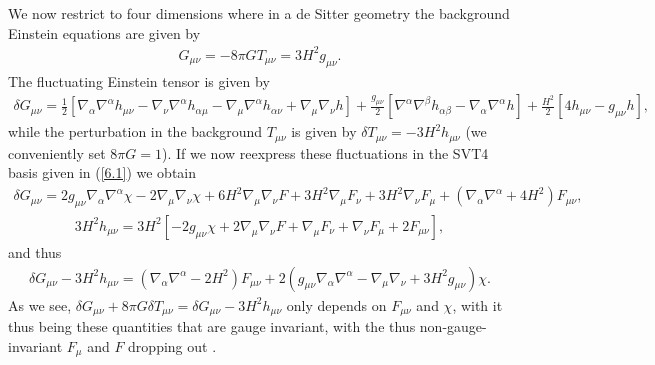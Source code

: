 \documentclass[aps,onecolumn,10pt]{revtex4}
\numberwithin{equation}{section}
\numberwithin{equation}{section}
\begin{document}
We now restrict to  four dimensions where in a de Sitter geometry  the background Einstein equations are given by 
%
\begin{eqnarray}
G_{\mu\nu}=-8\pi G T_{\mu\nu}=3H^2g_{\mu\nu}.
\label{6.15}
\end{eqnarray}
% 
The fluctuating Einstein tensor is given by 
%
\begin{eqnarray}
\delta G_{\mu\nu}=\frac{1}{2}\left[\nabla_{\alpha}\nabla^{\alpha}h_{\mu\nu}-\nabla_{\nu}\nabla^{\alpha}h_{\alpha\mu}-\nabla_{\mu}\nabla^{\alpha}h_{\alpha\nu}+\nabla_{\mu}\nabla_{\nu}h\right]
+\frac{g_{\mu\nu}}{2}\left[\nabla^{\alpha}\nabla^{\beta}h_{\alpha\beta}-\nabla_{\alpha}\nabla^{\alpha}h\right]
+\frac{H^2}{2}\left[4h_{\mu\nu}-g_{\mu\nu}h\right],
\label{6.16}
\end{eqnarray}
% 
while the perturbation in the background $T_{\mu\nu}$ is given by $\delta T_{\mu\nu}=-3H^2h_{\mu\nu}$ (we conveniently set $8\pi G=1$). If we now reexpress these fluctuations in  the SVT4 basis given in (\ref{6.1}) we obtain
%
\begin{eqnarray}
\delta G_{\mu\nu}=2g_{\mu\nu}\nabla_{\alpha}\nabla^{\alpha}\chi-2\nabla_{\mu}\nabla_{\nu}\chi
+6H^2\nabla_{\mu}\nabla_{\nu}F
+3H^2 \nabla_{\mu}F_{\nu}+3H^2\nabla_{\nu}F_{\mu}+(\nabla_{\alpha}\nabla^{\alpha}+4H^2)F_{\mu\nu},
\label{6.17}
\end{eqnarray}
% 
%
\begin{eqnarray}
3H^2h_{\mu\nu}=3H^2\left[-2g_{\mu\nu}\chi+2\nabla_{\mu}\nabla_{\nu}F
+ \nabla_{\mu}F_{\nu}+\nabla_{\nu}F_{\mu}+2F_{\mu\nu}\right],
\label{6.18}
\end{eqnarray}
% 
and thus 
%
\begin{eqnarray}
\delta G_{\mu\nu}-3H^2h_{\mu\nu}=(\nabla_{\alpha}\nabla^{\alpha}-2H^2)F_{\mu\nu}+2(g_{\mu\nu}\nabla_{\alpha}\nabla^{\alpha}-\nabla_{\mu}\nabla_{\nu}+3H^2g_{\mu\nu})\chi.
\label{6.19}
\end{eqnarray}
% 
As we see, $\delta G_{\mu\nu}+8\pi G\delta T_{\mu\nu}=\delta G_{\mu\nu}-3H^2h_{\mu\nu}$ only depends on $F_{\mu\nu}$ and $\chi$,  with it thus being these quantities that are  gauge invariant, with the thus non-gauge-invariant $F_{\mu}$ and $F$ dropping out \cite{footnote9}.
\end{document}

